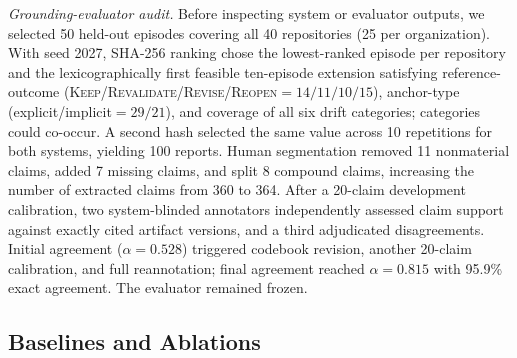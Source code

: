 \documentclass[10pt,conference]{IEEEtran}
\begin{document}
\par\noindent\textit{Grounding-evaluator audit.} Before inspecting system or evaluator outputs, we selected 50 held-out episodes covering all 40 repositories (25 per organization). With seed 2027, SHA-256 ranking chose the lowest-ranked episode per repository and the lexicographically first feasible ten-episode extension satisfying reference-outcome (\textsc{Keep}/\textsc{Revalidate}/\textsc{Revise}/\textsc{Reopen}$=14/11/10/15$), anchor-type (explicit/implicit$=29/21$), and coverage of all six drift categories; categories could co-occur. A second hash selected the same value across 10 repetitions for both systems, yielding 100 reports. Human segmentation removed 11 nonmaterial claims, added 7 missing claims, and split 8 compound claims, increasing the number of extracted claims from 360 to 364. After a 20-claim development calibration, two system-blinded annotators independently assessed claim support against exactly cited artifact versions, and a third adjudicated disagreements. Initial agreement ($\alpha=0.528$) triggered codebook revision, another 20-claim calibration, and full reannotation; final agreement reached $\alpha=0.815$ with 95.9\% exact agreement. The evaluator remained frozen.





\subsection{Baselines and Ablations}
\label{subsec:baselines-ablations}
\end{document}
